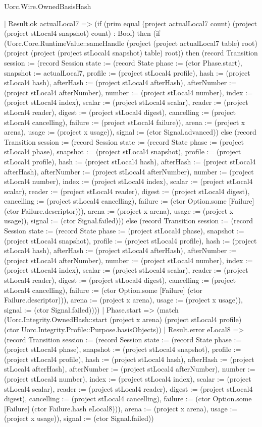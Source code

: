 \begin{lexlean}{Uorc.Wire.OwnedBasisHash}
\begin{semanticmodule}
{        | Result.ok actualLocal7 => (if (prim equal (project actualLocal7 count) (project (project stLocal4 snapshot) count) : Bool) then (if (Uorc.Core.RuntimeValue::sameHandle (project (project actualLocal7 table) root) (project (project (project stLocal4 snapshot) table) root)) then (record Transition {session := (record Session {state := (record State {phase := (ctor Phase.start), snapshot := actualLocal7, profile := (project stLocal4 profile), hash := (project stLocal4 hash), afterHash := (project stLocal4 afterHash), afterNumber := (project stLocal4 afterNumber), number := (project stLocal4 number), index := (project stLocal4 index), scalar := (project stLocal4 scalar), reader := (project stLocal4 reader), digest := (project stLocal4 digest), cancelling := (project stLocal4 cancelling), failure := (project stLocal4 failure)}), arena := (project x arena), usage := (project x usage)}), signal := (ctor Signal.advanced)}) else (record Transition {session := (record Session {state := (record State {phase := (project stLocal4 phase), snapshot := (project stLocal4 snapshot), profile := (project stLocal4 profile), hash := (project stLocal4 hash), afterHash := (project stLocal4 afterHash), afterNumber := (project stLocal4 afterNumber), number := (project stLocal4 number), index := (project stLocal4 index), scalar := (project stLocal4 scalar), reader := (project stLocal4 reader), digest := (project stLocal4 digest), cancelling := (project stLocal4 cancelling), failure := (ctor Option.some [Failure] (ctor Failure.descriptor))}), arena := (project x arena), usage := (project x usage)}), signal := (ctor Signal.failed)})) else (record Transition {session := (record Session {state := (record State {phase := (project stLocal4 phase), snapshot := (project stLocal4 snapshot), profile := (project stLocal4 profile), hash := (project stLocal4 hash), afterHash := (project stLocal4 afterHash), afterNumber := (project stLocal4 afterNumber), number := (project stLocal4 number), index := (project stLocal4 index), scalar := (project stLocal4 scalar), reader := (project stLocal4 reader), digest := (project stLocal4 digest), cancelling := (project stLocal4 cancelling), failure := (ctor Option.some [Failure] (ctor Failure.descriptor))}), arena := (project x arena), usage := (project x usage)}), signal := (ctor Signal.failed)})))
      | Phase.start => (match (Uorc.Integrity.OwnedHash::start (project x arena) (project stLocal4 profile) (ctor Uorc.Integrity.Profile::Purpose.basisObjects))
        | Result.error eLocal8 => (record Transition {session := (record Session {state := (record State {phase := (project stLocal4 phase), snapshot := (project stLocal4 snapshot), profile := (project stLocal4 profile), hash := (project stLocal4 hash), afterHash := (project stLocal4 afterHash), afterNumber := (project stLocal4 afterNumber), number := (project stLocal4 number), index := (project stLocal4 index), scalar := (project stLocal4 scalar), reader := (project stLocal4 reader), digest := (project stLocal4 digest), cancelling := (project stLocal4 cancelling), failure := (ctor Option.some [Failure] (ctor Failure.hash eLocal8))}), arena := (project x arena), usage := (project x usage)}), signal := (ctor Signal.failed)})
}
\end{semanticmodule}
\end{lexlean}
